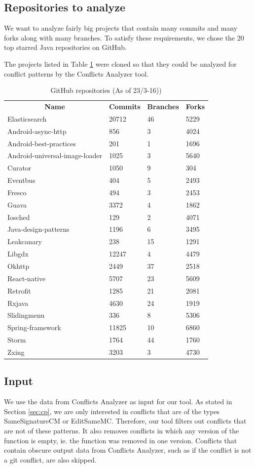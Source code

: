 \subsection{Repositories to analyze}
We want to analyze fairly big projects that contain many commits and many forks along with many branches. To satisfy these requirements, we chose the 20 top starred Java repositories on GitHub.

The projects listed in Table \ref{table:repositories} were cloned so that they could be analyzed for conflict patterns by the Conflicts Analyzer tool.
\FloatBarrier
\begin{table}
\caption{GitHub repositories (As of 23/3-16))}\label{table:repositories}
\begin{tabular}{ l l l l}
\hline
\multicolumn{1}{c}{\textbf{Name}} & \multicolumn{1}{c}{\textbf{Commits}} & \multicolumn{1}{c}{\textbf{Branches}} & \multicolumn{1}{c}{\textbf{Forks}}\\
Elasticsearch & 20712 & 46 & 5229\\
Android-async-http & 856 & 3 & 4024\\
Android-best-practices & 201 & 1 & 1696\\
Android-universal-image-loader & 1025 & 3 & 5640\\
Curator & 1050 & 9 & 304\\
Eventbus & 404 & 5 & 2493\\
Fresco & 494 & 3 & 2453\\
Guava & 3372 & 4 & 1862\\
Iosched & 129 & 2 & 4071\\
Java-design-patterns & 1196 & 6 & 3495\\
Leakcanary & 238 & 15 & 1291\\
Libgdx & 12247 & 4 & 4479\\
Okhttp & 2449 & 37 & 2518\\
React-native & 5707 & 23 & 5609\\
Retrofit & 1285 & 21 & 2081\\
Rxjava & 4630 & 24 & 1919\\
Slidingmenu & 336 & 8 & 5306\\
Spring-framework & 11825 & 10 & 6860\\
Storm & 1764 & 44 & 1760\\
Zxing & 3203 & 3 & 4730
\end{tabular}
\end{table}
\FloatBarrier

\subsection{Input}
We use the data from Conflicts Analyzer as input for our tool. As stated in Section \ref{sec:cp}, we are only interested in conflicts that are of the types SameSignatureCM or EditSameMC. Therefore, our tool filters out conflicts that are not of these patterns. It also removes conflicts in which any version of the function is empty, ie. the function was removed in one version. Conflicts that contain obscure output data from Conflicts Analyzer, such as if the conflict is not a git conflict, are also skipped.

